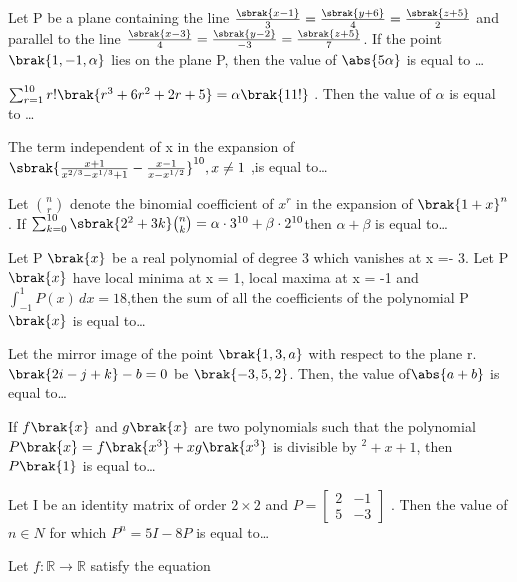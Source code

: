 \iffalse
\title{2021}
\author{AI24BTECH11006}
\section{integer}
\fi
\item Let P be a plane containing the line $
\frac{\sbrak{x - 1}}{3} = \frac{\sbrak{y + 6}}{4} = \frac{\sbrak{z + 5}}{2} $ and parallel to the line $
		\frac{\sbrak{x - 3}}{4} = \frac{\sbrak{y - 2}}{-3} = \frac{\sbrak{z + 5}}{7} $. If the point $\brak{1,-1,\alpha}$ lies on the plane P, then the value of $\abs{5\alpha}$ is equal to \dots
\hfill{}
	\item $\sum_{r=1}^{10} r!\brak{ r^3 + 6r^2 + 2r + 5 } = \alpha \brak{11!}$ . Then the value of $\alpha$ is equal to \dots
\hfill{}
	\item The term independent of x in the expansion of $
\sbrak{ \frac{x + 1}{x^{2/3} - x^{1/3} + 1} - \frac{x - 1}{x - x^{1/2}} }^{10} , x \neq 1$ ,is equal to\dots
\hfill{}
\item  Let $ \binom{n}{r} $ denote the binomial coefficient of $ x^r $ in the expansion of $ \brak{1+x}^n $. If $    \sum_{k=0}^{10} \sbrak{2^2 + 3k} \binom{n}{k} = \alpha \cdot 3^{10} + \beta \cdot 2^{10}$then $\alpha + \beta$ is equal to\dots
\hfill{}
\item  Let P $\brak{x}$ be a real polynomial of degree 3 which vanishes at x =- 3. Let P$\brak{x}$ have local minima at x = 1, local maxima at x = -1 and $\int_{-1}^{1} P(x) \, dx = 18$,then the sum of all the coefficients of the polynomial P $\brak{x}$ is equal to\dots
\hfill{}
\item   Let the mirror image of the point $\brak{1, 3, a}$ with respect to the plane r. $\brak{2i - j + k} - b = 0$ be $\brak{-3, 5, 2}$. Then, the value of$ \abs{a + b}$ is equal to\dots
\hfill{}
\item If $f\brak{x}$ and $g\brak{x}$ are two polynomials such that the polynomial $P \brak{x} = f \brak{x^3} + x g \brak{x^3}$ is divisible by $^2 + x + 1$, then $P \brak{1}$ is equal to\dots
\hfill{}
\item  Let I be an identity matrix of order $2 \times 2$  and $
P = \begin{bmatrix} 
2 & -1 \\ 
5 & -3 
\end{bmatrix}
$ . Then the value of $n\in N$ for which $P^n=5I-8P$ is equal to\dots
\hfill{}
\item Let  $f : \mathbb{R} \to \mathbb{R}$ satisfy the equation 
